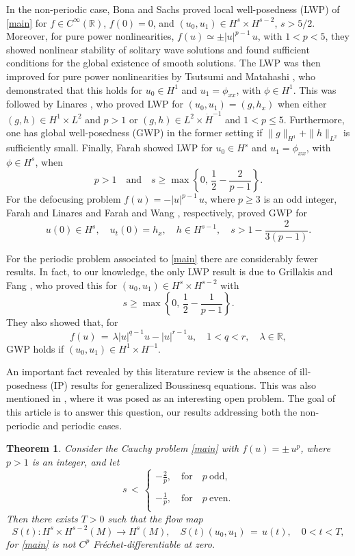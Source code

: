 \documentclass{amsart}
\newtheorem{theorem}{Theorem}[section]
\begin{document}
In the non-periodic case, Bona and Sachs \cite{BS} proved local well-posedness (LWP) of \eqref{main} for $f\in C^\infty(\mathbb{R})$, $f(0)=0$, and $(u_0,u_1)\in H^s \times H^{s-2}$, $s>5/2$. Moreover, for pure power nonlinearities, $f(u)\simeq\pm |u|^{p-1}\,u$, with $1<p<5$, they showed nonlinear stability of solitary wave solutions and found sufficient conditions for the global existence of smooth solutions.  The LWP was then improved for pure power nonlinearities by Tsutsumi and Matahashi \cite{TM}, who demonstrated that this holds for $u_0\in H^1$ and $u_1=\phi_{xx}$, with $\phi\in H^1$. This was followed by Linares \cite{L93}, who proved LWP for $(u_0,u_1)=(g, h_x)$ when either $(g,h) \in H^1\times L^2$ and $p>1$ or $(g,h) \in L^2 \times \dot{H}^{-1}$  and $1<p\leq 5$. Furthermore, one has global well-posedness (GWP) in the former setting if $\|g\|_{H^1}+\|h\|_{L^2}$ is sufficiently small. Finally, Farah \cite{F092} showed LWP for $u_0\in H^s$ and $u_1=\phi_{xx}$, with $\phi\in H^s$, when
\[
p>1 \quad \text{and} \quad s\geq \max \left\{0,\,\frac{1}{2}-\frac{2}{p-1}\right\}. \]
For the defocusing problem $f(u)= -|u|^{p-1}\,u$, where $p\geq 3$ is an odd integer, Farah and Linares \cite{FL} and Farah and Wang \cite{FW12}, respectively, proved GWP for 
\[
u(0)\in H^s, \quad u_t(0)=h_x , \quad h \in H^{s-1}, \quad s> 1-\frac{2}{3(p-1)}.
\]

For the periodic problem associated to \eqref{main} there are considerably fewer results. In fact, to our knowledge, the only LWP result is due to Grillakis and Fang \cite{FG96}, who proved this for $(u_0,u_1)\in H^s \times H^{s-2}$  with 
\[
s\geq \max \left\{0,\,\frac{1}{2}-\frac{1}{p-1}\right\}. \]
They also showed that, for
\[
f(u)\,=\,\lambda |u|^{q-1}u - |u|^{r-1}u, \quad 1<q<r, \quad \lambda\in \mathbb{R},\] 
GWP holds if $(u_0,u_1)\in H^1\times H^{-1}$. 

An important fact revealed by this literature review is the absence of ill-posedness (IP) results for generalized Boussinesq equations. This  was also mentioned in  \cite{FW12}, where it was posed as an interesting open problem. The goal of this article is to answer this question, our results addressing both the non-periodic and periodic cases. 

\begin{theorem}
Consider the Cauchy problem \eqref{main} with  $f(u)=\pm\, u^p$, where $p>1$ is an integer, and let 
\begin{equation}
s\,<\,\left\{
\begin{array}{l}
-\frac{2}{p}, \quad \text{for} \quad p \ \text{odd},\\
\\
-\frac{1}{p}, \quad \text{for} \quad p \ \text{even}.\\
\end{array}\right.
\label{sp}
\end{equation} 
Then there exists $T>0$ such that the flow map
\begin{equation}
S(t):  H^{s} \times H^{s-2}(M) \to H^{s}(M), \quad S(t)(u_0,u_1)\,=\,u(t), \quad 0< t < T,
\label{solmap}
\end{equation}
for \eqref{main} is not $C^p$ Fr\'{e}chet-differentiable at zero.
\label{mainth}
\end{theorem}
\end{document}

